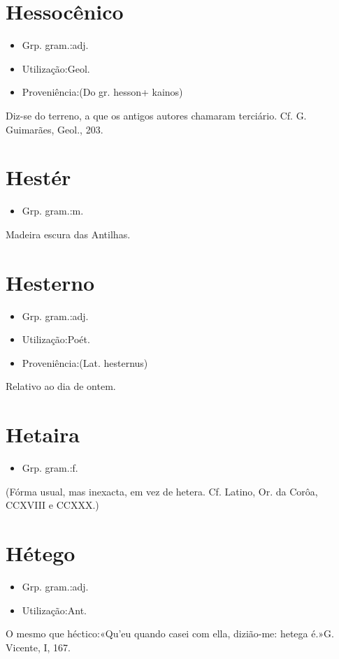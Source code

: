 \documentclass{article}
\begin{document}
\section{Hessocênico}
\begin{itemize}
\item {Grp. gram.:adj.}
\end{itemize}
\begin{itemize}
\item {Utilização:Geol.}
\end{itemize}
\begin{itemize}
\item {Proveniência:(Do gr. \textunderscore hesson\textunderscore  + \textunderscore kainos\textunderscore )}
\end{itemize}
Diz-se do terreno, a que os antigos autores chamaram terciário. Cf. G. Guimarães, \textunderscore Geol.\textunderscore , 203.
\section{Hestér}
\begin{itemize}
\item {Grp. gram.:m.}
\end{itemize}
Madeira escura das Antilhas.
\section{Hesterno}
\begin{itemize}
\item {Grp. gram.:adj.}
\end{itemize}
\begin{itemize}
\item {Utilização:Poét.}
\end{itemize}
\begin{itemize}
\item {Proveniência:(Lat. \textunderscore hesternus\textunderscore )}
\end{itemize}
Relativo ao dia de ontem.
\section{Hetaira}
\begin{itemize}
\item {Grp. gram.:f.}
\end{itemize}
(Fórma usual, mas inexacta, em vez de \textunderscore hetera\textunderscore . Cf. Latino, \textunderscore Or. da Corôa\textunderscore , CCXVIII e CCXXX.)
\section{Hétego}
\begin{itemize}
\item {Grp. gram.:adj.}
\end{itemize}
\begin{itemize}
\item {Utilização:Ant.}
\end{itemize}
O mesmo que \textunderscore héctico\textunderscore :«\textunderscore Qu'eu quando casei com ella, dizião-me: hetega é.\textunderscore »G. Vicente, I, 167.
\end{document}

